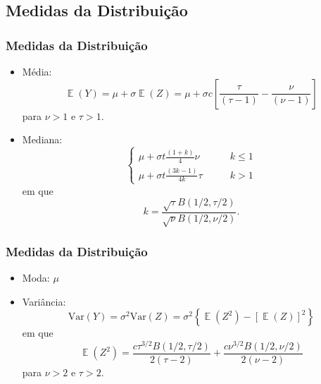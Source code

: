 \documentclass[13pt, aspectratio=169]{beamer}
\DeclareMathOperator{\EX}{\mathbb{E}}%
\begin{document}
\subsection{Medidas da Distribuição}
\begin{frame}
    \frametitle{Medidas da Distribuição}
    \begin{itemize}
        \item Média:
            \begin{equation*}
                \EX(Y) = \mu + \sigma \EX(Z) = \mu + \sigma c \left[ \frac{\tau}{(\tau - 1)} - \frac{\nu}{(\nu - 1)} \right]
            \end{equation*}
            para $\nu > 1$ e $\tau > 1$.
        \pause
        \item Mediana: 
            \begin{equation*}
                \begin{cases}
                    \mu + \sigma t \frac{(1 + k)}{4}\nu \qquad &k \leq 1 \\
                    \mu + \sigma t \frac{(3k - 1)}{4k} \tau \qquad &k > 1
                \end{cases}
            \end{equation*}
        \pause
            em que
            \begin{equation*}
                k = \frac{\sqrt{\tau} B(1/2, \tau/2)}{\sqrt{\nu} B(1/2, \nu/2)}.
            \end{equation*}
    \end{itemize}
\end{frame}

\begin{frame}
    \frametitle{Medidas da Distribuição}
    \begin{itemize}
        \item Moda: $\mu$
        \item Variância:
            \begin{equation*}
                \text{Var}(Y) = \sigma^2 \text{Var}(Z) = \sigma^2 \left\{\EX(Z^2) - [\EX(Z)]^2 \right\}
            \end{equation*}
            \pause
            em que \begin{equation*}
                \EX(Z^2) = \frac{c \tau^{3/2} B(1/2, \tau/2)}{2(\tau -2)} + \frac{c \nu^{3/2} B(1/2, \nu/2)}{2(\nu -2)}
            \end{equation*}
            para $\nu > 2$  e $\tau > 2$.
    \end{itemize}   
\end{frame}
\end{document}
